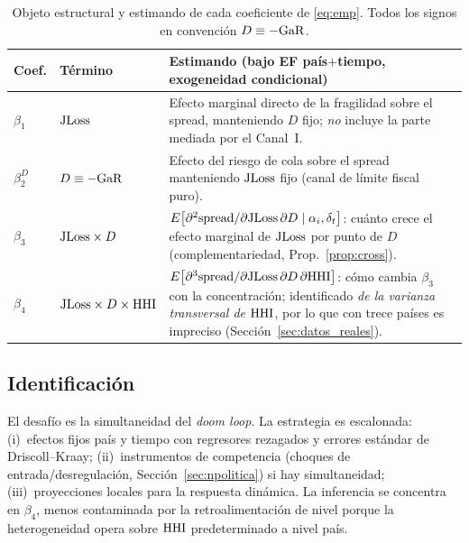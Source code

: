 \begin{table}[t]
\centering
\small
\begin{tabular}{@{}p{1.3cm}p{3.0cm}p{7.6cm}@{}}
\toprule
Coef. & Término & Estimando (bajo EF país$+$tiempo, exogeneidad condicional) \\
\midrule
$\beta_1$ & $\mathrm{JLoss}$ & Efecto marginal directo de la fragilidad sobre el spread, manteniendo $D$ fijo; \emph{no} incluye la parte mediada por el Canal~I. \\
$\beta_2^{D}$ & $D\equiv-\mathrm{GaR}$ & Efecto del riesgo de cola sobre el spread manteniendo $\mathrm{JLoss}$ fijo (canal de límite fiscal puro). \\
$\beta_3$ & $\mathrm{JLoss}\times D$ & $E\!\left[\partial^2\mathrm{spread}/\partial\mathrm{JLoss}\,\partial D\mid \alpha_i,\delta_t\right]$: cuánto crece el efecto marginal de $\mathrm{JLoss}$ por punto de $D$ (complementariedad, Prop.~\ref{prop:cross}). \\
$\beta_4$ & $\mathrm{JLoss}\times D\times\mathrm{HHI}$ & $E\!\left[\partial^3\mathrm{spread}/\partial\mathrm{JLoss}\,\partial D\,\partial\mathrm{HHI}\right]$: cómo cambia $\beta_3$ con la concentración; identificado \emph{de la varianza transversal de $\mathrm{HHI}$}, por lo que con trece países es impreciso (Sección~\ref{sec:datos_reales}). \\
\bottomrule
\end{tabular}
\caption[Objeto estructural y estimando de cada coeficiente]{Objeto estructural y estimando de cada coeficiente de \eqref{eq:emp}. Todos los signos en convención $D\equiv-\mathrm{GaR}$.}
\label{tab:estimandos}
\end{table}

\subsection{Identificación}
El desafío es la simultaneidad del \textit{doom loop}. La estrategia es escalonada: (i)~efectos fijos país y tiempo con regresores rezagados y errores estándar de Driscoll--Kraay; (ii)~instrumentos de competencia (choques de entrada/desregulación, Sección~\ref{sec:npolitica}) si hay simultaneidad; (iii)~proyecciones locales para la respuesta dinámica. La inferencia se concentra en $\beta_4$, menos contaminada por la retroalimentación de nivel porque la heterogeneidad opera sobre $\mathrm{HHI}$ predeterminado a nivel país.

